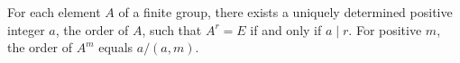 For each element $A$ of a finite group, there exists a uniquely determined positive integer $a$, the order of $A$, such that $A^r = E$ if and only if $a \mid r$. For positive $m$, the order of $A^m$ equals $a/(a,m)$.
